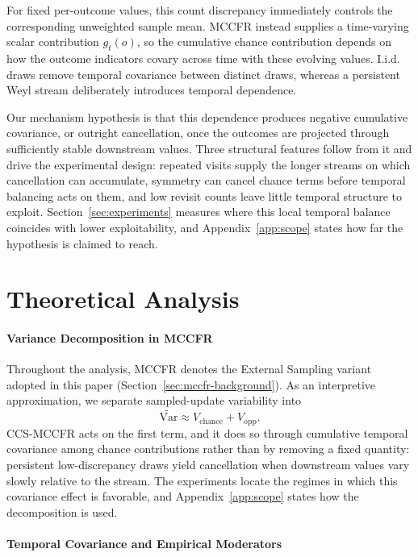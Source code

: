 \documentclass[11pt]{article}
\begin{document}
For fixed per-outcome values, this count discrepancy immediately controls the corresponding unweighted sample mean. MCCFR instead supplies a time-varying scalar contribution $g_t(o)$, so the cumulative chance contribution depends on how the outcome indicators covary across time with these evolving values. I.i.d. draws remove temporal covariance between distinct draws, whereas a persistent Weyl stream deliberately introduces temporal dependence.

Our mechanism hypothesis is that this dependence produces negative cumulative covariance, or outright cancellation, once the outcomes are projected through sufficiently stable downstream values. Three structural features follow from it and drive the experimental design: repeated visits supply the longer streams on which cancellation can accumulate, symmetry can cancel chance terms before temporal balancing acts on them, and low revisit counts leave little temporal structure to exploit. Section~\ref{sec:experiments} measures where this local temporal balance coincides with lower exploitability, and Appendix~\ref{app:scope} states how far the hypothesis is claimed to reach.

\section{Theoretical Analysis}
\label{sec:theory}

\paragraph{Variance Decomposition in MCCFR}

Throughout the analysis, MCCFR denotes the External Sampling variant adopted in this paper (Section~\ref{sec:mccfr-background}). As an interpretive approximation, we separate sampled-update variability into
\[
\widetilde{\mathrm{Var}} \approx V_{\mathrm{chance}} + V_{\mathrm{opp}}.
\]
CCS-MCCFR acts on the first term, and it does so through cumulative temporal covariance among chance contributions rather than by removing a fixed quantity: persistent low-discrepancy draws yield cancellation when downstream values vary slowly relative to the stream. The experiments locate the regimes in which this covariance effect is favorable, and Appendix~\ref{app:scope} states how the decomposition is used.

\paragraph{Temporal Covariance and Empirical Moderators}
\label{sec:revisit}
\end{document}
